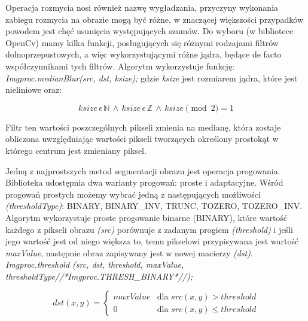 \documentclass[a4paper,12pt]{article}
\begin{document}
			    Operacja rozmycia nosi również nazwę wygładzania, przyczyny wykonania zabiegu rozmycia na obrazie mogą być różne, w znaczącej większości przypadków powodem jest chęć usunięcia występujących szumów. Do wyboru (w bibliotece OpenCv) mamy kilka funkcji, posługujących się różnymi rodzajami filtrów dolnoprzepustowych, a więc wykorzystującymi różne jądra, będące de facto współczynnikami tych filtrów. Algorytm wykorzystuje funkcję:
			    \textit{Imgproc.medianBlur(src, dst, ksize);}
			    gdzie \textit{ksize} jest rozmiarem jądra, które jest nieliniowe oraz:  
			    
			    \begin{displaymath}
                    ksize\, \epsilon\, \mathbb{N}\, \wedge\, ksize\, \epsilon\, \mathbb{Z}\, \wedge\, ksize\pmod{2} = 1
                \end{displaymath}
                
                Filtr ten wartości poszczególnych pikseli zmienia na medianę, która zostaje obliczona uwzględniając wartości pikseli tworzących określony prostokąt w którego centrum jest zmieniany piksel. 
                
			    Jedną z najprostszych metod segmentacji obrazu jest operacja progowania.  Biblioteka udostępnia dwa warianty progowań: proste i adaptacyjne. 
			    Wśród progowań prostych możemy wybrać jedną z następujących możliwości  \textit{(thresholdType)}: BINARY, BINARY\_INV, TRUNC, TOZERO, TOZERO\_INV.
			    Algorytm wykorzystuje proste progowanie binarne (BINARY), które wartość każdego z pikseli obrazu \textit{(src)} porównuje z zadanym progiem \textit{(threshold)} i jeśli jego wartość jest od niego większa to, temu pikselowi przypisywana jest wartość \textit{maxValue}, następnie obraz zapisywany jest w nowej macierzy \textit{(dst)}.\\
			    \textit{Imgproc.threshold (src, dst, threshold, maxValue, thresholdType//*Imgproc.THRESH\_BINARY*//);}
			    
			    \begin{displaymath}
                    dst (x, y) =  
                    \left\{
                        \begin{array}{ll}
                            maxValue & \textrm{dla } src (x, y) > threshold \\
                            0 & \textrm{dla } src (x, y) \leqslant threshold
                        \end{array}
                    \right.
                \end{displaymath}
			    
\end{document}
